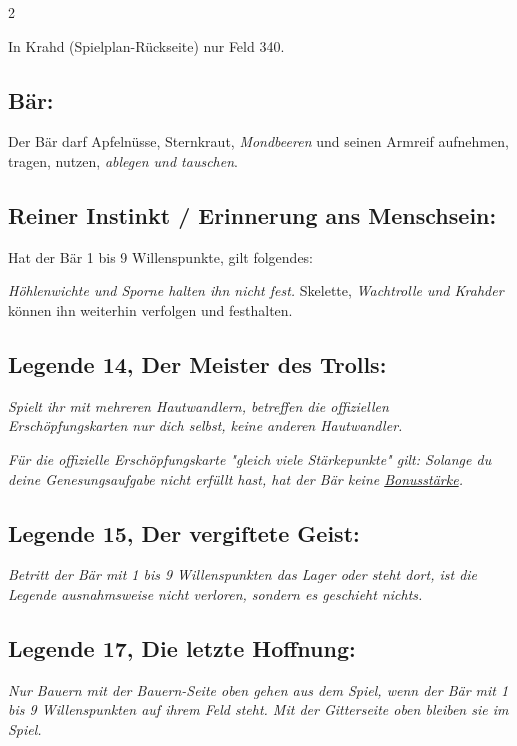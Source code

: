 \documentclass[10pt, a4paper, oneside]{book}
\newcommand{\fan}[1]{\textit{#1}}
\begin{document}
\begin{multicols*}{2}
\begin{bgcolor}
\bullet{} In Krahd (Spielplan-Rückseite) nur Feld 340.
\supercite{dh-begleitheft}




\subsection{Bär:}

Der Bär darf Apfelnüsse, Sternkraut, \fan{Mondbeeren} und seinen Armreif aufnehmen, tragen, nutzen, \fan{ablegen und tauschen}.
\supercite{dh-baer}

\subsection{Reiner Instinkt / Erinnerung ans Menschsein:}

Hat der Bär 1 bis 9 Willenspunkte, gilt folgendes:

\bullet{} \fan{Höhlenwichte und Sporne halten ihn nicht fest.} Skelette, \fan{Wachtrolle und Krahder} können ihn weiterhin verfolgen und festhalten.
\supercite{46529}


\subsection{Legende 14, Der Meister des Trolls:}

\fan{Spielt ihr mit mehreren Hautwandlern, betreffen die offiziellen Erschöpfungskarten nur dich selbst, keine anderen Hautwandler.}

\fan{Für die offizielle Erschöpfungskarte "gleich viele Stärkepunkte" gilt: Solange du deine Genesungsaufgabe nicht erfüllt hast, hat der Bär keine \hyperref[bonusstaerke]{Bonusstärke}.}


\subsection{Legende 15, Der vergiftete Geist:}

\fan{Betritt der Bär mit 1 bis 9 Willenspunkten das Lager oder steht dort, ist die Legende ausnahmsweise nicht verloren, sondern es geschieht nichts.}


\subsection{Legende 17, Die letzte Hoffnung:}

\fan{Nur Bauern mit der Bauern-Seite oben gehen aus dem Spiel, wenn der Bär mit 1 bis 9 Willenspunkten auf ihrem Feld steht. Mit der Gitterseite oben bleiben sie im Spiel.}


\end{bgcolor}
\end{multicols*}
\end{document}
